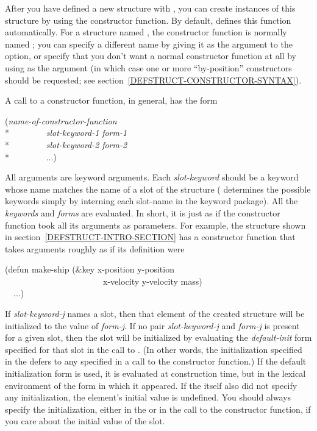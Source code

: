After you have defined a new structure with , you can
create instances of this structure by using the constructor function.
By default,  defines this function automatically.
For a structure named , the constructor function is normally
named ;
you can specify a different name
by giving it as the argument to the
 option, or specify that you don't
want a normal
constructor function at all by using {\false} as the argument
(in which case one or more ``by-position'' constructors should be
requested; see section~\ref{DEFSTRUCT-CONSTRUCTOR-SYNTAX}).

A call to a constructor function, in general, has the form
\begin{lisp}
({\it name-of-constructor-function} \\*
~~~~~~~~{\it slot-keyword-1} {\it form-1} \\*
~~~~~~~~{\it slot-keyword-2} {\it form-2} \\*
~~~~~~~~...)
\end{lisp}
All arguments are keyword arguments.  Each {\it slot-keyword} should be a
keyword whose name matches the name of a slot of the structure
( determines the possible keywords simply by interning each
slot-name in the keyword package).  All the {\it keywords} and {\it forms}
are evaluated.  In short, it is just as if the constructor function
took all its arguments as  parameters.  For example, the
 structure shown in section~\ref{DEFSTRUCT-INTRO-SECTION}
has a constructor function that takes arguments roughly as if its definition
were
\begin{lisp}
(defun make-ship (\&key x-position y-position \\
~~~~~~~~~~~~~~~~~~~~~~~x-velocity y-velocity mass) \\
~~...)
\end{lisp}

\label{defstruct-initialization}
If {\it slot-keyword-j} names a slot, then that element of
the created structure will be initialized to the value of {\it form-j}.
If no pair {\it slot-keyword-j} and {\it form-j}
is present for a given slot, then the slot will be
initialized by evaluating the {\it default-init} form specified
for that slot in the call to .
(In other words, the initialization specified in the 
defers to any specified in a call to the constructor function.)
If the default initialization form is used, it is evaluated
at construction time, but
in the lexical environment of the  form in which it appeared.
If the  itself also did not
specify any initialization, the element's initial value is undefined.
You should always specify the initialization, either in the 
or in the call to the constructor function,
if you care about the initial value of the slot.

